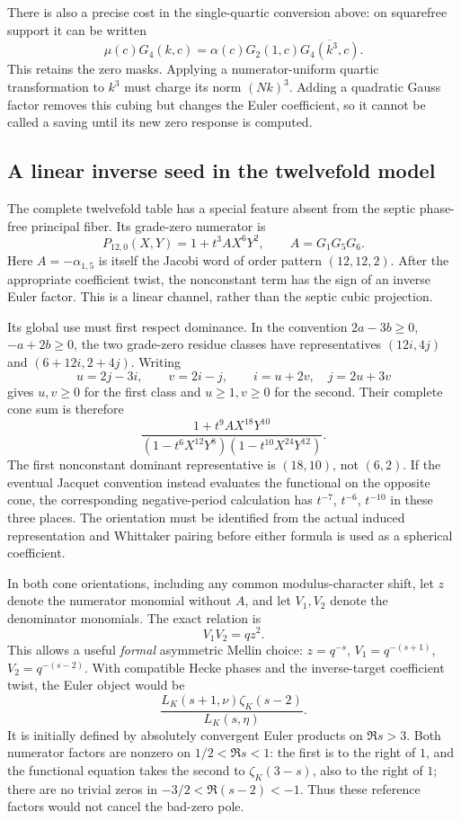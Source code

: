 \documentclass[11pt]{article}
\begin{document}
There is also a precise cost in the single-quartic conversion above:
on squarefree support it can be written
\[
 \mu(c)G_4(k,c)=
 \alpha(c)G_2(1,c)\overline{G_4(k^3,c)}.
\]
This retains the zero masks. Applying a numerator-uniform quartic
transformation to \(k^3\) must charge its norm \((Nk)^3\).
Adding a quadratic Gauss factor removes this cubing but changes the
Euler coefficient, so it cannot be called a saving until its new
zero response is computed.

\subsection{A linear inverse seed in the twelvefold model}

The complete twelvefold table has a special feature absent from the
septic phase-free principal fiber. Its grade-zero numerator is
\[
 P_{12,0}(X,Y)=1+t^3 A X^6Y^2,\qquad A=G_1G_5G_6.
\]
Here \(A=-\alpha_{1,5}\) is itself the Jacobi word of order pattern
\((12,12,2)\). After the appropriate coefficient twist, the
nonconstant term has the sign of an inverse Euler factor.
This is a linear channel, rather than the septic cubic projection.

Its global use must first respect dominance. In the convention
\(2a-3b\ge0\), \(-a+2b\ge0\), the two grade-zero residue classes have
representatives \((12i,4j)\) and \((6+12i,2+4j)\).
Writing
\[
 u=2j-3i,\qquad v=2i-j,\qquad
 i=u+2v,\quad j=2u+3v
\]
gives \(u,v\ge0\) for the first class and \(u\ge1,v\ge0\) for the
second. Their complete cone sum is therefore
\[
 \frac{1+t^9 A X^{18}Y^{10}}
 {(1-t^6X^{12}Y^8)(1-t^{10}X^{24}Y^{12})}.
\]
The first nonconstant dominant representative is \((18,10)\), not
\((6,2)\). If the eventual Jacquet convention instead evaluates the
functional on the opposite cone, the corresponding negative-period
calculation has \(t^{-7}\), \(t^{-6}\), \(t^{-10}\) in these three
places. The orientation must be identified from the actual induced
representation and Whittaker pairing before either formula is used
as a spherical coefficient.

In both cone orientations, including any common modulus-character
shift, let \(z\) denote the numerator monomial without \(A\), and
let \(V_1,V_2\) denote the denominator monomials. The exact relation is
\[
 V_1V_2=qz^2.
\]
This allows a useful \emph{formal} asymmetric Mellin choice:
\(z=q^{-s}\), \(V_1=q^{-(s+1)}\), \(V_2=q^{-(s-2)}\).
With compatible Hecke phases and the inverse-target coefficient twist,
the Euler object would be
\[
 \frac{L_K(s+1,\nu)\zeta_K(s-2)}{L_K(s,\eta)}.
\]
It is initially defined by absolutely convergent Euler products on
\(\Re s>3\). Both numerator factors are nonzero on
\(1/2<\Re s<1\): the first is to the right of \(1\), and the functional
equation takes the second to \(\zeta_K(3-s)\), also to the right of
\(1\); there are no trivial zeros in
\(-3/2<\Re(s-2)<-1\). Thus these reference factors would not cancel
the bad-zero pole.
\end{document}
